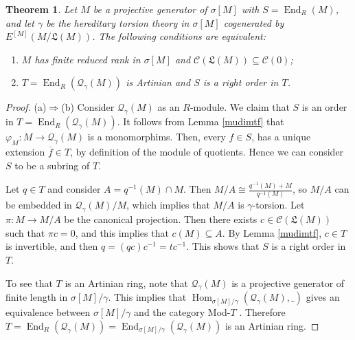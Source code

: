 \documentclass{amsart}
\newtheorem{thm}{Theorem}[section]
\theoremstyle{definition}
\theoremstyle{remark}
\numberwithin{equation}{section}
\DeclareMathOperator{\Ker}{Ker}
\DeclareMathOperator{\Hom}{Hom}
\DeclareMathOperator{\End}{End}
\newcommand{\sm}{\sigma[M]}
\begin{document}
\begin{thm}\label{smallgen}
	Let $M$ be a projective generator of $\sm$ with $S=\End_R(M)$, 
	and let $\gamma$ be the hereditary torsion theory in $\sm$ 
	cogenerated by $E^{[M]}(M/\mathfrak{L}(M))$. 
	The following conditions are equivalent:
	\begin{enumerate}[label=\emph{(\alph*)}]
		\item $M$ has finite reduced rank in $\sm$ and 
		$\mathcal{C}(\mathfrak{L}(M))\subseteq\mathcal{C}(0)$; 
		\item $T=\End_R(\mathcal{Q}_\gamma(M))$ is Artinian and 
		$S$ is a right order in $T$.
	\end{enumerate}
\end{thm}

\begin{proof}
	(a)$\Rightarrow$(b) 
	Consider $\mathcal{Q}_\gamma(M)$ as an $R$-module. 
	We claim that $S$ is an order in $T=\End_R(\mathcal{Q}_\gamma(M))$. 
	It follows from Lemma \ref{mudimtf} 
	that $\varphi_M:M\to \mathcal{Q}_\gamma(M)$ is a monomorphims. Then, every $f\in S$, has a unique extension $\overline{f}\in T$, by definition of the module of quotients. 
	Hence we can consider $S$ to be a subring of $T$. 
	
	Let $q\in T$ and consider $A=q^{-1}(M)\cap M$. 
	Then $M/A\cong\frac{q^{-1}(M)+M}{q^{-1}(M)}$,
	so $M/A$  can be embedded in $\mathcal{Q}_\gamma(M)/M$,
	which implies that $M/A$ is $\gamma$-torsion. 
	Let $\pi:M\to M/A$ be the canonical projection. 
	Then there exists $c\in\mathcal{C}(\mathfrak{L}(M))$ such that $\pi c=0$, 
	and this implies that $c(M)\subseteq A$. 
	By Lemma \ref{mudimtf}, $c\in T$ is invertible, 
	and then $q=(qc)c^{-1}=tc^{-1}$. 
	This shows that $S$ is a right order in $T$. 
	
	To see that $T$ is an Artinian ring, 
	note that $\mathcal{Q}_\gamma(M)$ 
	is a projective generator of finite length in $\sm/\gamma$. 
	This implies that $\Hom_{\sm/\gamma}(\mathcal{Q}_\gamma(M),\_)$ 
	gives an equivalence between $\sm/\gamma$ 
	and the category Mod-$T$ \cite[Ch. X, Theorem 4.1]{stenstromrings}.  
	Therefore 
	$T=\End_R(\mathcal{Q}_\gamma(M))=\End_{\sm/\gamma}(\mathcal{Q}_\gamma(M))$ 
	is an Artinian ring.
	

\end{proof}
\end{document}
